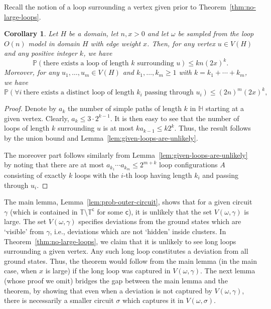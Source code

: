 \documentclass[12pt,reqno]{article}
\def\T{\mathbb{T}}
\newtheorem{cor}[theorem]{Corollary}
\renewcommand{\Pr}{\mathbb{P}}
\newcommand{\HH}{\mathbb{H}}
\newcommand{\clr}{{{\mathsf{c}}}}
\begin{document}
Recall the notion of a loop surrounding a vertex given prior to Theorem~\ref{thm:no-large-loops}.

\begin{cor}\label{cl:no-large-loops-for-small-x}
  Let $H$ be a domain, let $n,x>0$ and let $\omega$ be sampled from the loop $O(n)$ model in domain $H$ with edge weight $x$. Then, for any vertex $u \in V(H)$ and any positive integer $k$, we have
  \[
  \Pr(\text{there exists a loop of length $k$ surrounding $u$}) \le k n (2x)^k .
  \]
  Moreover, for any $u_1,\dots,u_m \in V(H)$ and $k_1,\dots,k_m \ge 1$ with $k=k_1+\cdots+k_m$, we have
    \[
    \Pr(\forall i~\text{there exists a distinct loop of length $k_i$ passing through $u_i$}) \le (2n)^m (2x)^k ,
    \]
\end{cor}

\begin{proof}
Denote by $a_k$ the number of simple paths of length $k$ in $\HH$
starting at a given vertex. Clearly, $a_k \leq 3 \cdot 2^{k-1}$. It
is then easy to see that the number of loops of length $k$
surrounding $u$ is at most $k a_{k-1} \le k 2^k$. Thus, the result
follows by the union bound and
Lemma~\ref{lem:given-loops-are-unlikely}.

The moreover part follows similarly from Lemma~\ref{lem:given-loops-are-unlikely} by noting that there are at most $a_{k_1}\cdots a_{k_m} \le 2^{m+k}$ loop configurations $A$ consisting of exactly $k$ loops with the $i$-th loop having length $k_i$ and passing through $u_i$.
\end{proof}


The main lemma, Lemma~\ref{lem:prob-outer-circuit}, shows that for a given circuit $\gamma$ (which is contained in $\T \setminus \T^\clr$ for some $\clr$), it is unlikely that the set $V(\omega,\gamma)$ is large. The set $V(\omega,\gamma)$ specifies deviations from the ground states which are `visible' from $\gamma$, i.e., deviations which are not `hidden' inside clusters. In Theorem~\ref{thm:no-large-loops}, we claim that it is unlikely to see long loops surrounding a given vertex. Any such long loop constitutes a deviation from all ground states. Thus, the theorem would follow from the main lemma (in the main case, when $x$ is large) if the long loop was captured in $V(\omega,\gamma)$. The next lemma (whose proof we omit) bridges the gap between the main lemma and the theorem, by showing that even when a deviation is not captured by $V(\omega,\gamma)$, there is necessarily a smaller circuit $\sigma$ which captures it in $V(\omega,\sigma)$.
\end{document}

